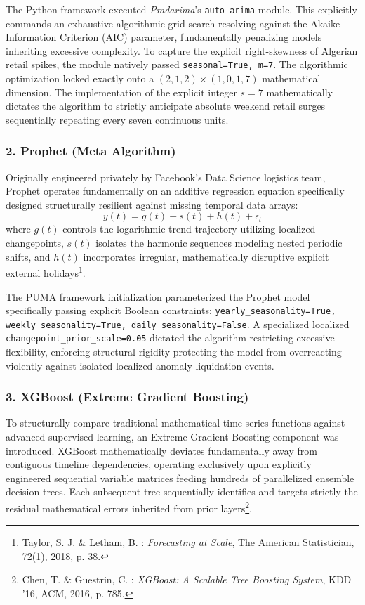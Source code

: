 \documentclass[12pt,a4paper]{report}
\begin{document}
The Python framework executed \textit{Pmdarima}'s \texttt{auto\_arima} module. This explicitly commands an exhaustive algorithmic grid search resolving against the Akaike Information Criterion (AIC) parameter, fundamentally penalizing models inheriting excessive complexity. To capture the explicit right-skewness of Algerian retail spikes, the module natively passed \texttt{seasonal=True, m=7}. The algorithmic optimization locked exactly onto a $(2, 1, 2) \times (1, 0, 1, 7)$ mathematical dimension. The implementation of the explicit integer $s=7$ mathematically dictates the algorithm to strictly anticipate absolute weekend retail surges sequentially repeating every seven continuous units.

\subsubsection{2. Prophet (Meta Algorithm)}
Originally engineered privately by Facebook’s Data Science logistics team, Prophet operates fundamentally on an additive regression equation specifically designed structurally resilient against missing temporal data arrays:
\begin{equation}
    y(t) = g(t) + s(t) + h(t) + \epsilon_t
\end{equation}
where $g(t)$ controls the logarithmic trend trajectory utilizing localized changepoints, $s(t)$ isolates the harmonic sequences modeling nested periodic shifts, and $h(t)$ incorporates irregular, mathematically disruptive explicit external holidays\footnote{Taylor, S. J. \& Letham, B. : \textit{Forecasting at Scale}, The American Statistician, 72(1), 2018, p. 38.}.

The PUMA framework initialization parameterized the Prophet model specifically passing explicit Boolean constraints: \texttt{yearly\_seasonality=True, weekly\_seasonality=True, daily\_seasonality=False}. A specialized localized \texttt{changepoint\_prior\_scale=0.05} dictated the algorithm restricting excessive flexibility, enforcing structural rigidity protecting the model from overreacting violently against isolated localized anomaly liquidation events.

\subsubsection{3. XGBoost (Extreme Gradient Boosting)}
To structurally compare traditional mathematical time-series functions against advanced supervised learning, an Extreme Gradient Boosting component was introduced. XGBoost mathematically deviates fundamentally away from contiguous timeline dependencies, operating exclusively upon explicitly engineered sequential variable matrices feeding hundreds of parallelized ensemble decision trees. Each subsequent tree sequentially identifies and targets strictly the residual mathematical errors inherited from prior layers\footnote{Chen, T. \& Guestrin, C. : \textit{XGBoost: A Scalable Tree Boosting System}, KDD '16, ACM, 2016, p. 785.}.
\end{document}
